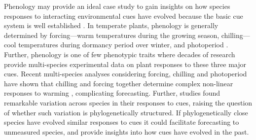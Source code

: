 \documentclass{article}\usepackage[]{graphicx}\usepackage[]{color}
\begin{document}

Phenology may provide an ideal case study to gain insights on how species responses to interacting environmental cues have evolved because the basic cue system is well established \citep{chuinearees}. In temperate plants, phenology is generally determined by forcing---warm temperatures during the growing season, chilling---cool temperatures during dormancy period over winter, and photoperiod \citep{chuinearees}. Further, phenology is one of few phenotypic traits where decades of research provide multi-species experimental data on plant responses to these three major cues. Recent multi-species analyses considering forcing, chilling and photoperiod have shown that chilling and forcing together determine complex non-linear responses to warming \citep{flynn2018,ettinger2020}, complicating forecasting. Further, studies found remarkable variation across species in their responses to cues, raising the question of whether such variation is phylogenetically structured. If phylogenetically close species have evolved similar responses to cues it could facilitate forecasting to unmeasured species, and provide insights into how cues have evolved in the past. \\
\end{document}
